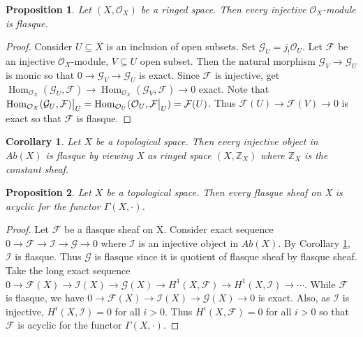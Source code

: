 \documentclass{ctexart}
\newtheorem{proposition}{Proposition}[section]
\newtheorem{corollary}{Corollary}[section]
\renewcommand{\hom}{\operatorname{Hom}}
\begin{document}
\begin{proposition}
    Let $(X, \mathcal{O}_{X})$ be a ringed space.
    Then every injective $\mathcal{O}_{X}$-module is flasque.
    \label{Proposition 7.4}
\end{proposition}
\begin{proof}
    Consider $U \subseteq X$ is an inclusion of open subsets.
    Set $\mathcal{G}_{U} = j_{!}\mathcal{O}_{U}$.
    Let $\mathcal{F}$ be an injective $\mathcal{O}_{X}$-module, $V \subseteq U$ open subset.
    Then the natural morphism $\mathcal{G}_{V} \longrightarrow \mathcal{G}_{U}$ is monic so that $0 \longrightarrow \mathcal{G}_{V} \longrightarrow \mathcal{G}_{U}$ is exact.
    Since $\mathcal{F}$ is injective, get $\hom_{\mathcal{O}_{X}}(\mathcal{G}_{U}, \mathcal{F}) \longrightarrow \hom_{\mathcal{O}_{X}}(\mathcal{G}_{V}, \mathcal{F}) \longrightarrow 0$ exact.
    Note that $\hom_{\mathcal{O}_{X}}(\mathcal{G}_{U}, \mathcal{F})\big{|}_{U} = \hom_{\mathcal{O}_{U}}(\mathcal{O}_{U}, \mathcal{F}\big{|}_{U}) = \mathcal{F}(U)$.
    Thus $\mathcal{F}(U) \longrightarrow \mathcal{F}(V) \longrightarrow 0$ is exact so that $\mathcal{F}$ is flasque.
\end{proof}
\begin{corollary}
    Let $X$ be a topological space.
    Then every injective object in $Ab(X)$ is flasque by viewing X as ringed space $(X, \mathbb{Z}_{X})$ where $\mathbb{Z}_{X}$ is the constant sheaf.
    \label{Corollary 7.1}
\end{corollary}
\begin{proposition}
    Let $X$ be a topological space.
    Then every flasque sheaf on X is acyclic for the functor $\Gamma(X, \cdot)$.
    \label{Proposition 7.5}
\end{proposition}
\begin{proof}
    Let $\mathcal{F}$ be a flasque sheaf on X.
    Consider exact sequence $0 \longrightarrow \mathcal{F} \longrightarrow \mathcal{I} \longrightarrow \mathcal{G} \longrightarrow 0$ where $\mathcal{I}$ is an injective object in $Ab(X)$.
    By Corollary \ref{Corollary 7.1}, $\mathcal{I}$ is flasque.
    Thus $\mathcal{G}$ is flasque since it is quotient of flasque sheaf by flasque sheaf.
    Take the long exact sequence $0 \longrightarrow \mathcal{F}(X) \longrightarrow \mathcal{I}(X) \longrightarrow \mathcal{G}(X) \longrightarrow H^{1}(X, \mathcal{F}) \longrightarrow H^{1}(X, \mathcal{I}) \longrightarrow \cdots$.
    While $\mathcal{F}$ is flasque, we have $0 \longrightarrow \mathcal{F}(X) \longrightarrow \mathcal{I}(X) \longrightarrow \mathcal{G}(X) \longrightarrow 0$ is exact.
    Also, as $\mathcal{I}$ is injective, $H^{i}(X, \mathcal{I}) = 0$ for all $i > 0$.
    Thus $H^{i}(X, \mathcal{F}) = 0$ for all $i > 0$ so that $\mathcal{F}$ is acyclic for the functor $\Gamma(X, \cdot)$. 
\end{proof}
\end{document}
